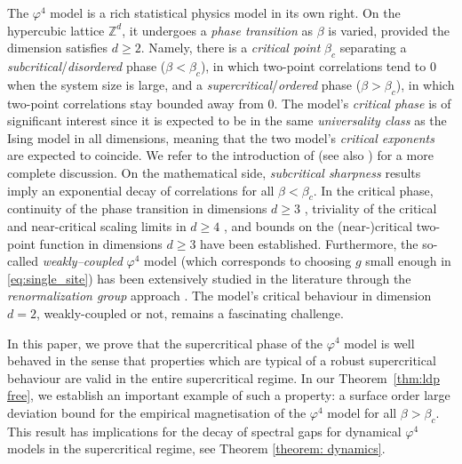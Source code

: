 \documentclass[11pt,a4paper]{article}
\theoremstyle{definition}
\numberwithin{equation}{section}
\begin{document}
The $\varphi^4$ model is a rich statistical physics model in its own right. On the hypercubic lattice $\mathbb Z^d$, it undergoes a \emph{phase transition} as $\beta$ is varied, provided the dimension satisfies $d \geq 2$. Namely, there is a \emph{critical point} $\beta_c$ separating a \emph{subcritical}/\emph{disordered} phase ($\beta < \beta_c$), in which two-point correlations tend to $0$ when the system size is large, and a \emph{supercritical}/\emph{ordered} phase ($\beta>\beta_c$), in which two-point correlations stay bounded away from $0$. The model's \emph{critical phase} is of significant interest since it is expected to be in the same \emph{universality class} as the Ising model in all dimensions, meaning that the two model's \emph{critical exponents} are expected to coincide. We refer to the introduction of \cite{GunaratnamPanagiotisPanisSeveroPhi42022} (see also \cite{A21,PanisThesis}) for a more complete discussion. On the mathematical side, \emph{subcritical sharpness} results \cite{AizenmanBarskyFernandezSharpnessIsing1987} imply an exponential decay of correlations for all $\beta<\beta_c$. In the critical phase, continuity of the phase transition in dimensions $d\geq 3$ \cite{GunaratnamPanagiotisPanisSeveroPhi42022}, triviality of the critical and near-critical scaling limits in $d\geq 4$ \cite{AizenmanGeometricAnalysis1982,FrohlichTriviality1982,AizenmanDuminilTriviality2021,PanisTriviality2023}, and bounds on the (near-)critical two-point function in dimensions $d\geq 3$ \cite{FrohlichSimonSpencerIRBounds1976,FrohlichIsraelLiebSimon1978,Sakai2015Phi4,DuminilPanis2024newLB} have been established.  Furthermore, the so-called \emph{weakly--coupled} $\varphi^4$ model (which corresponds to choosing $g$ small enough in \eqref{eq:single_site}) has been extensively studied in the literature through the \emph{renormalization group} approach \cite{GawedzkiKupiainen1985massless,Hara1987rigorous,FeldmanMagnenRivasseau1987construction,BauerschmidtBrydgesSlade2014Phi4fourdim,SladeTombergRGWeakPhi4in2016,BauerschmidtBrydgesSladeBOOKRG2019}. The model's critical behaviour in dimension $d=2$, weakly-coupled or not, remains a fascinating challenge.

In this paper, we prove that the supercritical phase of the $\varphi^4$ model is well behaved in the sense that properties which are typical of a robust supercritical behaviour are valid in the entire supercritical regime. 
In our Theorem~\ref{thm:ldp free}, we establish an important example of such a property: a surface order large deviation bound for the empirical magnetisation of the $\varphi^4$ model for all $\beta>\beta_c$. This result has implications for the decay of spectral gaps for dynamical $\varphi^4$ models in the supercritical regime, see Theorem \ref{theorem: dynamics}.
\end{document}
